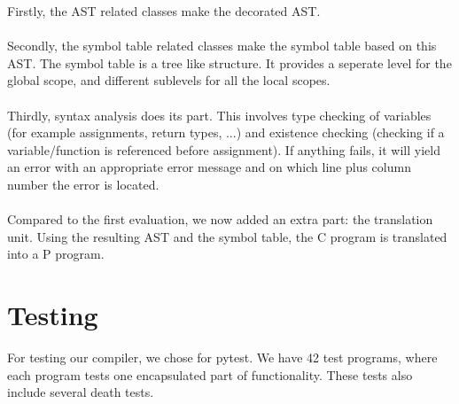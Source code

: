 \documentclass{article}
\begin{document}
\hfill \break
Firstly, the AST related classes make the decorated AST. \\ \\
Secondly, the symbol table related classes make the symbol table based on this AST. The symbol table is a tree like structure. It provides a seperate level for the global scope, and different sublevels for all the local scopes. \\ \\
Thirdly, syntax analysis does its part. This involves type checking of variables (for example assignments, return types, ...) and existence checking (checking if a variable/function is referenced before assignment). If anything fails, it will yield an error with an appropriate error message and on which line plus column number the error is located. \\ \\
\hfill \break
Compared to the first evaluation, we now added an extra part: the translation unit. Using the resulting AST and the symbol table, the C program is translated into a P program.

\section{Testing}
For testing our compiler, we chose for pytest. We have 42 test programs, where each program tests one encapsulated part of functionality. These tests also include several death tests.
\end{document}
